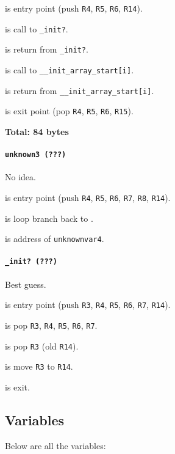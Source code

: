  is entry point (push \texttt{R4}, \texttt{R5},
\texttt{R6}, \texttt{R14}).

 is call to \texttt{\_init?}.

 is return from \texttt{\_init?}.

 is call to \texttt{\_\_init\_array\_start[i]}.

 is return from \texttt{\_\_init\_array\_start[i]}.

 is exit point (pop \texttt{R4}, \texttt{R5},
\texttt{R6}, \texttt{R15}).

\textbf{Total: 84 bytes}

\paragraph{\texttt{unknown3 (???)}} No idea.

 is entry point (push \texttt{R4}, \texttt{R5},
\texttt{R6}, \texttt{R7}, \texttt{R8}, \texttt{R14}).

 is loop branch back to .

 is address of \texttt{unknownvar4}.

\paragraph{\texttt{\_init? (???)}} Best guess.

 is entry point (push \texttt{R3}, \texttt{R4},
\texttt{R5}, \texttt{R6}, \texttt{R7}, \texttt{R14}).

 is pop \texttt{R3}, \texttt{R4}, \texttt{R5},
\texttt{R6}, \texttt{R7}.

 is pop \texttt{R3} (old \texttt{R14}).

 is move \texttt{R3} to \texttt{R14}.

 is exit.

\subsection{Variables}

Below are all the variables:

\vspace{1em}

